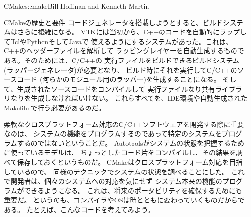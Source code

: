 \begin{aosachapter}{CMake}{s:cmake}{Bill Hoffman and Kenneth Martin}
\begin{aosasect1}{CMakeの歴史と要件}
コードジェネレータを搭載しようとすると、ビルドシステムはさらに複雑になる。
VTKには当初から、C++のコードを自動的にラップしてTclやPythonそしてJavaで
使えるようにするシステムがあった。これは、C++のヘッダーファイルを解析して
ラッピングレイヤーを自動生成するものである。そのためには、C/C++の
実行ファイルをビルドできるビルドシステム(ラッパージェネレータ)が必要となり、
ビルド時にそれを実行してC/C++のソースコード
(何らかのモジュール用のラッパー)を生成することになる。
そして、生成されたソースコードをコンパイルして
実行ファイルなり共有ライブラリなりを生成しなければいけない。
これらすべてを、IDE環境や自動生成されたMakefile
で行う必要があるのだ。

柔軟なクロスプラットフォーム対応のC/C++ソフトウェアを開発する際に重要なのは、
システムの機能をプログラムするのであって特定のシステムをプログラムするのではないということだ。
Autotoolsがシステムの状態を把握するために使っているモデルは、
ちょっとしたコード片をコンパイルし、その結果を調べて保存しておくというものだ。
CMakeはクロスプラットフォーム対応を目指しているので、
同様のテクニックでシステムの状態を調べることにした。
これで開発者は、個々のシステムへの対応を気にせず
システム本来の機能のプログラムができるようになる。
これは、将来のポータビリティを確保するためにも重要だ。
というのも、コンパイラやOSは時とともに変わっていくものだからである。
たとえば、こんなコードを考えてみよう。


\end{aosasect1}
\end{aosachapter}
